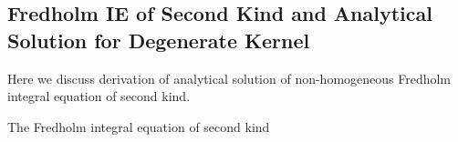 \begin{appendix}
\appendixpage
\chapter{}
\renewcommand{\thechapter}{\Roman{chapter}}

\pagestyle{empty}
\section{\label{apen:derivationdegenerate}Fredholm IE of Second Kind and Analytical Solution for Degenerate Kernel}
\label{appendix-1}
Here we discuss derivation of analytical solution of non-homogeneous Fredholm integral equation of second kind.


The Fredholm integral equation of second kind


\end{appendix}
